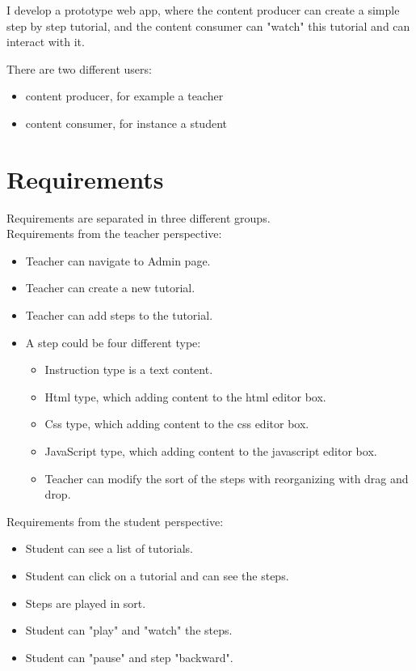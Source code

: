 \documentclass[11pt, a4paper, twoside, openright]{report}
\begin{document}
I develop a prototype web app, where the content producer can create a simple step by step tutorial, and the content consumer can "watch" this tutorial and can interact with it.

There are two different users:
\begin{itemize}[noitemsep]
\item content producer, for example a teacher
\item content consumer, for instance a student
\end{itemize}

\section{Requirements}

Requirements are separated in three different groups.\\

\noindent Requirements from the teacher perspective:
\begin{itemize}[noitemsep]
\item Teacher can navigate to Admin page.
\item Teacher can create a new tutorial.
\item Teacher can add steps to the tutorial.
\item A step could be four different type:
\begin{itemize}[noitemsep]
\item Instruction type is a text content.
\item Html type, which adding content to the html editor box.
\item Css type, which adding content to the css editor box.
\item JavaScript type, which adding content to the javascript editor box.
\item Teacher can modify the sort of the steps with reorganizing with drag and drop.
\end{itemize}
\end{itemize}

\noindent Requirements from the student perspective:
\begin{itemize}[noitemsep]
\item Student can see a list of tutorials.
\item Student can click on a tutorial and can see the steps.
\item Steps are played in sort.
\item Student can "play" and "watch" the steps.
\item Student can "pause" and step "backward".
\end{itemize}
\end{document}
